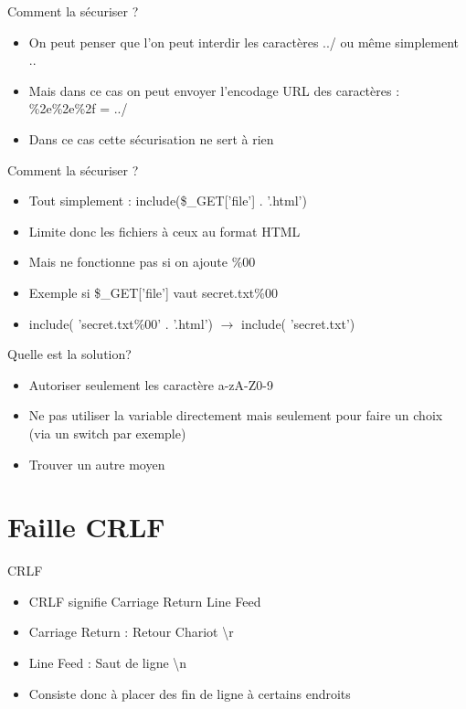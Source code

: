 \documentclass{beamer}
\begin{document}
\begin{frame}{Comment la sécuriser ?}
	\begin{itemize}
		\item On peut penser que l'on peut interdir les caractères ../ ou même simplement ..
		\item Mais dans ce cas on peut envoyer l'encodage URL des caractères : \%2e\%2e\%2f = ../
		\item Dans ce cas cette sécurisation ne sert à rien
	\end{itemize}
\end{frame}

\begin{frame}{Comment la sécuriser ?}
	\begin{itemize}
		\item<1-> Tout simplement : include(\$\_GET['file'] . '.html')
		\item<1-> Limite donc les fichiers à ceux au format HTML
		\item<2-> Mais ne fonctionne pas si on ajoute \%00
		\item<2-> Exemple si \$\_GET['file'] vaut secret.txt\%00 
		\item<2-> include( 'secret.txt\%00' . '.html') $\rightarrow$ include( 'secret.txt')
	\end{itemize}
\end{frame}

\begin{frame}{Quelle est la solution?}
	\begin{itemize}
		\item Autoriser seulement les caractère a-zA-Z0-9
		\item Ne pas utiliser la variable directement mais seulement pour faire un choix (via un switch par exemple)
		\item Trouver un autre moyen
	\end{itemize}
\end{frame}

\section{Faille CRLF}

\begin{frame}{CRLF}
	\begin{itemize}
		\item CRLF signifie Carriage Return Line Feed
		\item Carriage Return : Retour Chariot \textbackslash r
		\item Line Feed : Saut de ligne \textbackslash n
		\item Consiste donc à placer des fin de ligne à certains endroits
	\end{itemize}
\end{frame}
\end{document}
